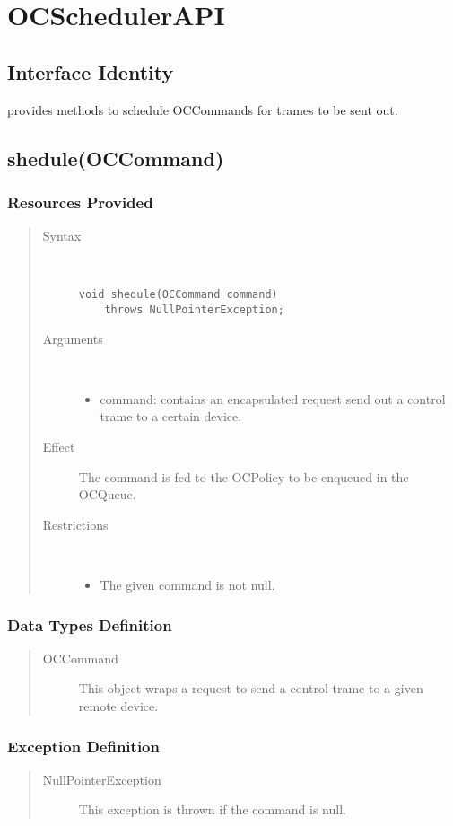 \section{OCSchedulerAPI}

\subsection{Interface Identity}

\npar {} provides methods to schedule
OCCommands for trames to be sent out.

\subsection{shedule(OCCommand)}

\subsubsection{Resources Provided}

\begin{quote}
	\begin{description}
		\item[Syntax] \ 
		\begin{verbatim}
void shedule(OCCommand command)
    throws NullPointerException;
		\end{verbatim}
		\item[Arguments] \
		\begin{itemize}
			\item command: contains an encapsulated request send out a control trame to
			a certain device.
		\end{itemize}
		\item[Effect] The command is fed to the OCPolicy to be enqueued in the
		OCQueue.
		\item[Restrictions] \ 
		\begin{itemize}
			\item The given command is not null.
		\end{itemize}
	\end{description} 
\end{quote}

\subsubsection{Data Types Definition}

\begin{quote}
	\begin{description}
		\item[OCCommand] This object wraps a request to send a control
		trame to a given remote device.
	\end{description}
\end{quote}

\subsubsection{Exception Definition}

\begin{quote}
	\begin{description}
		\item[NullPointerException] This exception is thrown if the command is null.
	\end{description} 
\end{quote}
